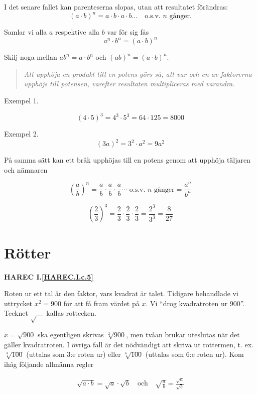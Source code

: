 I det senare fallet kan parenteserna slopas, utan att resultatet förändras:
\[
(a \cdot b)^n = a \cdot b \cdot a \cdot b \ldots
\quad \text{o.s.v. }n\text{ gånger.}
\]

Samlar vi alla \(a\) respektive alla \(b\) var för sig fås
\[a^n \cdot b^n = (a \cdot b)^n\]

Skilj noga mellan \(ab^n = a \cdot b^n\) och \((ab)^n = (a \cdot b)^n\).

\begin{quote}\emph{
Att upphöja en produkt till en potens görs så, att var och en av faktorerna
upphöjs till potensen, varefter resultaten multipliceras med varandra.
}\end{quote}

Exempel 1.

\[
(4 \cdot 5)^3 = 4^3 \cdot 5^3 = 64 \cdot 125 = 8000
\]

Exempel 2.
\[
(3a)^2 = 3^2 \cdot a^2 = 9a^2
\]

På samma sätt kan ett bråk upphöjas till en potens genom att upphöja täljaren
och nämnaren

\[
\left(\frac{a}{b}\right)^n =
\frac{a}{b} \cdot \frac{a}{b} \cdot \frac{a}{b} \cdots
\text{ o.s.v. }n\text{ gånger}
= \frac{a^n}{b^n}
\]

\[
\left(\frac{2}{3}\right)^3 = \frac{2}{3} \cdot \frac{2}{3} \cdot \frac{2}{3} =
\frac{2^3}{3^3} = \frac{8}{27}
\]

\section{Rötter}
\textbf{HAREC I.\ref{HAREC.I.c.5}\label{myHAREC.I.c.5}}

Roten ur ett tal är den faktor, vars kvadrat är talet.
Tidigare behandlade vi uttrycket \(x^2 = 900\) för att få fram värdet på \(x\). Vi
``drog kvadratroten ur 900''.
Tecknet \(\sqrt{\ \ \ \ }\) kallas rottecken.

\(x = \sqrt{900}\) ska egentligen skrivas \(\sqrt[2]{900}\),
men tvåan brukar uteslutas när det gäller kvadratroten. I övriga fall är det
nödvändigt att skriva ut rottermen, t. ex. \(\sqrt[3]{100}\) (uttalas
som 3:e roten ur) eller \(\sqrt[6]{100}\) (uttalas som 6:e roten ur).
Kom ihåg följande allmänna regler

\begin{gather*}
  \sqrt{a \cdot b} = \sqrt{a} \cdot \sqrt{b}
  \quad \text{och} \quad
  \sqrt{\frac{a}{b}} = \frac{\sqrt{a}}{\sqrt{b}}
\end{gather*}

